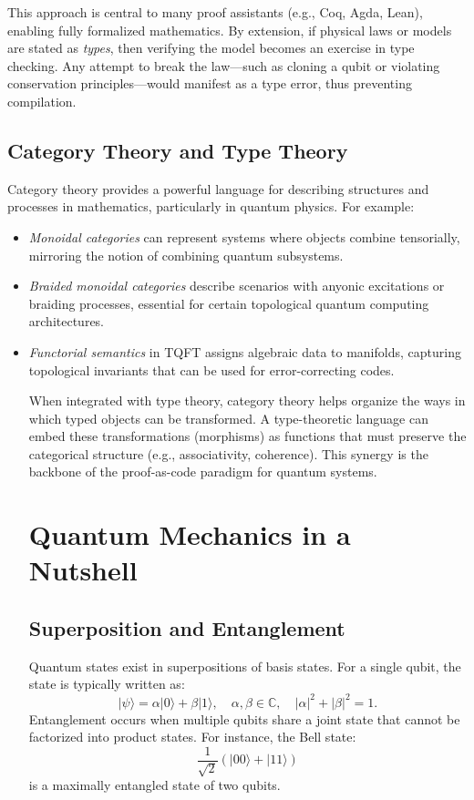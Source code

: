 \documentclass[12pt]{article}
\begin{document}
This approach is central to many proof assistants (e.g., Coq, Agda, Lean), enabling fully formalized mathematics. By extension, if physical laws or models are stated as \emph{types}, then verifying the model becomes an exercise in type checking. Any attempt to break the law—such as cloning a qubit or violating conservation principles—would manifest as a type error, thus preventing compilation.

\subsection{Category Theory and Type Theory}
Category theory provides a powerful language for describing structures and processes in mathematics, particularly in quantum physics. For example:
\begin{itemize}[label=$\bullet$]
    \item \emph{Monoidal categories} can represent systems where objects combine tensorially, mirroring the notion of combining quantum subsystems.
    \item \emph{Braided monoidal categories} describe scenarios with anyonic excitations or braiding processes, essential for certain topological quantum computing architectures.
    \item \emph{Functorial semantics} in TQFT assigns algebraic data to manifolds, capturing topological invariants that can be used for error-correcting codes.

When integrated with type theory, category theory helps organize the ways in which typed objects can be transformed. A type-theoretic language can embed these transformations (morphisms) as functions that must preserve the categorical structure (e.g., associativity, coherence). This synergy is the backbone of the proof-as-code paradigm for quantum systems.

\section{Quantum Mechanics in a Nutshell}
\label{sec:quantum}

\subsection{Superposition and Entanglement}
Quantum states exist in superpositions of basis states. For a single qubit, the state is typically written as:
\[
\lvert \psi \rangle = \alpha \lvert 0 \rangle + \beta \lvert 1 \rangle, \quad \alpha, \beta \in \mathbb{C}, \quad \lvert \alpha \rvert^2 + \lvert \beta \rvert^2 = 1.
\]
Entanglement occurs when multiple qubits share a joint state that cannot be factorized into product states. For instance, the Bell state:
\[
\frac{1}{\sqrt{2}}\left(\lvert 00 \rangle + \lvert 11 \rangle\right)
\]
is a maximally entangled state of two qubits.


\end{itemize}
\end{document}
